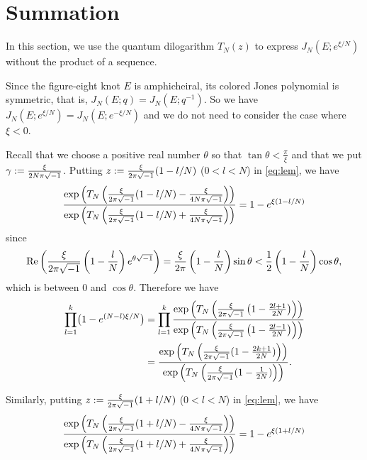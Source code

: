 \section{Summation}
In this section, we use the quantum dilogarithm $T_N(z)$ to express $J_N(E;e^{\xi/N})$ without the product of a sequence.
\par
Since the figure-eight knot $E$ is amphicheiral, its colored Jones polynomial is symmetric, that is, $J_{N}(E;q)=J_{N}(E;q^{-1})$.
So we have $J_{N}(E;e^{\xi/N})=J_{N}(E;e^{-\xi/N})$ and we do not need to consider the case where $\xi<0$.
\par
Recall that we choose a positive real number $\theta$ so that $\tan\theta<\frac{\pi}{\xi}$ and that we put $\gamma:=\frac{\xi}{2N\pi\sqrt{-1}}$.
Putting $z:=\frac{\xi}{2\pi\sqrt{-1}}(1-l/N)$ ($0<l<N$) in \eqref{eq:lem}, we have
\begin{equation*}
  \frac{\exp\left(T_{N}\left(\frac{\xi}{2\pi\sqrt{-1}}(1-l/N)-\frac{\xi}{4N\pi\sqrt{-1}}\right)\right)}
       {\exp\left(T_{N}\left(\frac{\xi}{2\pi\sqrt{-1}}(1-l/N)+\frac{\xi}{4N\pi\sqrt{-1}}\right)\right)}
  =
  1-e^{\xi(1-l/N)}
\end{equation*}
since
\begin{equation*}
  \operatorname{Re}\left(\frac{\xi}{2\pi\sqrt{-1}}\left(1-\frac{l}{N}\right)e^{\theta\sqrt{-1}}\right)
  =
  \frac{\xi}{2\pi}\left(1-\frac{l}{N}\right)\sin\theta
  <
  \frac{1}{2}\left(1-\frac{l}{N}\right)\cos\theta,
\end{equation*}
which is between $0$ and $\cos\theta$.
Therefore we have
\begin{equation*}
\begin{split}
  \prod_{l=1}^{k}\bigl(1-e^{(N-l)\xi/N}\bigr)
  &=
  \prod_{l=1}^{k}
  \frac{\exp\left(T_{N}\left(\frac{\xi}{2\pi\sqrt{-1}}\left(1-\frac{2l+1}{2N}\right)\right)\right)}
       {\exp\left(T_{N}\left(\frac{\xi}{2\pi\sqrt{-1}}\left(1-\frac{2l-1}{2N}\right)\right)\right)}
  \\
  &=
  \frac{\exp\left(T_{N}\left(\frac{\xi}{2\pi\sqrt{-1}}(1-\frac{2k+1}{2N})\right)\right)}
       {\exp\left(T_{N}\left(\frac{\xi}{2\pi\sqrt{-1}}(1-\frac{1}{2N})\right)\right)}.
\end{split}
\end{equation*}
\par
Similarly, putting $z:=\frac{\xi}{2\pi\sqrt{-1}}(1+l/N)$ ($0<l<N$) in \eqref{eq:lem}, we have
\begin{equation*}
  \frac{\exp
        \left(
          T_{N}
          \left(
            \frac{\xi}{2\pi\sqrt{-1}}(1+l/N)-\frac{\xi}{4N\pi\sqrt{-1}}
          \right)
        \right)}
       {\exp
        \left(
          T_{N}
          \left(
            \frac{\xi}{2\pi\sqrt{-1}}(1+l/N)+\frac{\xi}{4N\pi\sqrt{-1}}
          \right)
        \right)}
  =
  1-e^{\xi(1+l/N)}
\end{equation*}
